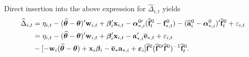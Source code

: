 \documentclass[12pt,fleqn]{article}
\begin{document}
Direct insertion into the above expression for $\widehat \Delta_{i,t}$ yields
\begin{align}
\widehat \Delta_{i,t} & = \eta_{i,t} - (\widehat{\boldsymbol{\theta}} - \boldsymbol{\theta})'\mathbf{w}_{i,t}  + \boldsymbol{\beta}_i'\mathbf{x}_{i,t}  - \boldsymbol{\alpha}_{*,i}^{0\prime}(\widehat{\mathbf{f}}_{t}^0-\mathbf{f}_{*,t}^0) - (\widehat{\mathbf{a}}_{i}^{0} - \boldsymbol{\alpha}_{*,i}^0)'\widehat{\mathbf{f}}_{t}^0 + \varepsilon_{i,t} \notag\\
& = \eta_{i,t} - (\widehat{\boldsymbol{\theta}} - \boldsymbol{\theta})'\mathbf{w}_{i,t}  + \boldsymbol{\beta}_i'\mathbf{x}_{i,t}  - \mathbf{a}_{*,i}'\overline{\mathbf{e}}_{*,t} + \varepsilon_{i,t} \notag\\
& - [ -\mathbf{w}_{i}(\widehat{\boldsymbol{\theta}} - \boldsymbol{\theta}) + \mathbf{x}_{i}\boldsymbol{\beta}_i  - \overline{\mathbf{e}}_*\mathbf{a}_{*,i} +  \boldsymbol{\varepsilon}_{i} ] \widehat{\mathbf{f}}^{0}(\widehat{\mathbf{f}}^{0\prime}\widehat{\mathbf{f}}^0)^{-1}\widehat{\mathbf{f}}_{t}^0 .
\end{align}
\end{document}
